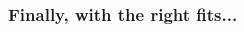\begin{frame}
\frametitle{Finally, with the right fits...}
\begin{columns}[c]
\begin{column}{0.55\textwidth} 
\begin{center}
\end{center}
\end{column}
\begin{column}{0.55\textwidth} 
 \end{column}
 \end{columns}

\end{frame}


